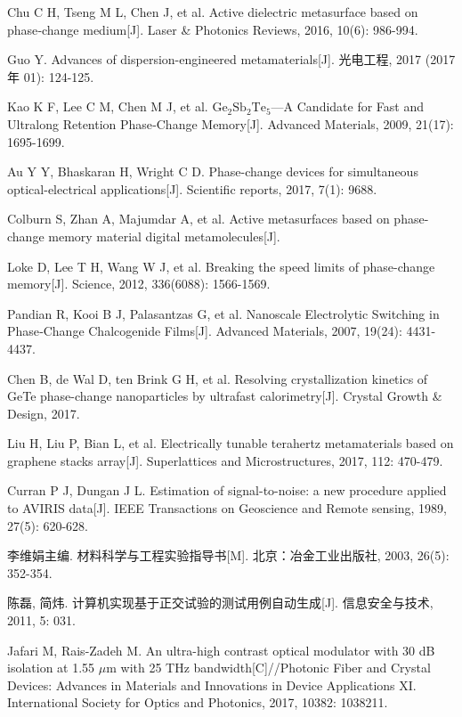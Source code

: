 \begin{thebibliography}{99}
 Chu C H, Tseng M L, Chen J, et al. Active dielectric metasurface based on phase‐change medium[J]. Laser \& Photonics Reviews, 2016, 10(6): 986-994.

 Guo Y. Advances of dispersion-engineered metamaterials[J]. 光电工程, 2017 (2017 年 01): 124-125.

 Kao K F, Lee C M, Chen M J, et al. $\mathrm{Ge_{2}Sb_{2}Te_{5}}$—A Candidate for Fast and Ultralong Retention Phase‐Change Memory[J]. Advanced Materials, 2009, 21(17): 1695-1699.

 Au Y Y, Bhaskaran H, Wright C D. Phase-change devices for simultaneous optical-electrical applications[J]. Scientific reports, 2017, 7(1): 9688.

 Colburn S, Zhan A, Majumdar A, et al. Active metasurfaces based on phase-change memory material digital metamolecules[J].

 Loke D, Lee T H, Wang W J, et al. Breaking the speed limits of phase-change memory[J]. Science, 2012, 336(6088): 1566-1569.

 Pandian R, Kooi B J, Palasantzas G, et al. Nanoscale Electrolytic Switching in Phase‐Change Chalcogenide Films[J]. Advanced Materials, 2007, 19(24): 4431-4437.

 Chen B, de Wal D, ten Brink G H, et al. Resolving crystallization kinetics of GeTe phase-change nanoparticles by ultrafast calorimetry[J]. Crystal Growth \& Design, 2017.

 Liu H, Liu P, Bian L, et al. Electrically tunable terahertz metamaterials based on graphene stacks array[J]. Superlattices and Microstructures, 2017, 112: 470-479.

 Curran P J, Dungan J L. Estimation of signal-to-noise: a new procedure applied to AVIRIS data[J]. IEEE Transactions on Geoscience and Remote sensing, 1989, 27(5): 620-628.

 李维娟主编. 材料科学与工程实验指导书[M]. 北京：冶金工业出版社, 2003, 26(5): 352-354.

 陈磊, 简炜. 计算机实现基于正交试验的测试用例自动生成[J]. 信息安全与技术, 2011, 5: 031.

 Jafari M, Rais-Zadeh M. An ultra-high contrast optical modulator with 30 dB isolation at 1.55 $\mu$m with 25 THz bandwidth[C]//Photonic Fiber and Crystal Devices: Advances in Materials and Innovations in Device Applications XI. International Society for Optics and Photonics, 2017, 10382: 1038211.


\end{thebibliography}
